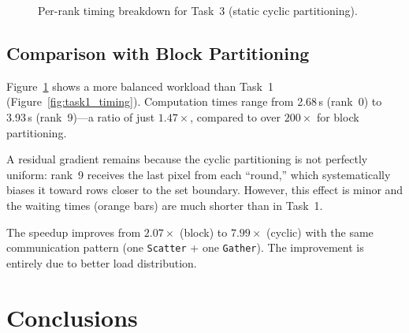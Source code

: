 \documentclass[11pt,a4paper]{article}
\begin{document}
\begin{figure}[h]\centering
{}
\caption{Per-rank timing breakdown for Task~3 (static cyclic partitioning).}
\label{fig:task3_timing}
\end{figure}

\subsection{Comparison with Block Partitioning}

Figure~\ref{fig:task3_timing} shows a more balanced workload
than Task~1 (Figure~\ref{fig:task1_timing}). Computation times range from
2.68\,s (rank~0) to 3.93\,s (rank~9)---a ratio of just $1.47\times$,
compared to over $200\times$ for block partitioning.

A residual gradient remains because the cyclic partitioning is not perfectly
uniform: rank~9 receives the last pixel from each ``round,'' which
systematically biases it toward rows closer to the set boundary. However,
this effect is minor and the waiting times (orange bars) are much shorter
than in Task~1.

The speedup improves from $2.07\times$ (block) to $7.99\times$ (cyclic)
with the same communication pattern (one \texttt{Scatter} + one
\texttt{Gather}). The improvement is entirely due to better load
distribution.


\section{Conclusions}
\end{document}
